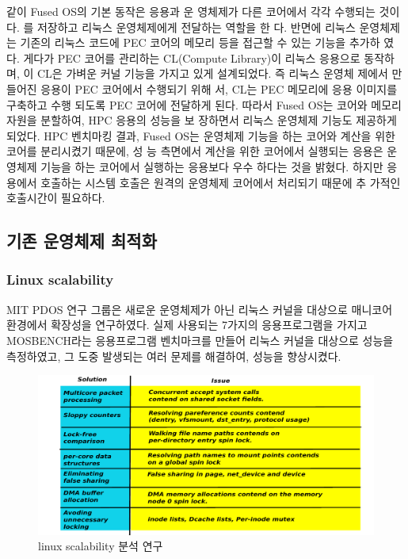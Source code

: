 같이 Fused OS의 기본 동작은 응용과 운
영체제가 다른 코어에서 각각 수행되는 것이다.
를 저장하고 리눅스 운영체제에게 전달하는 역할을 한
다. 반면에 리눅스 운영체제는 기존의 리눅스 코드에
PEC 코어의 메모리 등을 접근할 수 있는 기능을 추가하
였다. 게다가 PEC 코어를 관리하는 CL(Compute
Library)이 리눅스 응용으로 동작하며, 이 CL은 가벼운
커널 기능을 가지고 있게 설계되었다. 즉 리눅스 운영체
제에서 만들어진 응용이 PEC 코어에서 수행되기 위해
서, CL는 PEC 메모리에 응용 이미지를 구축하고 수행
되도록 PEC 코어에 전달하게 된다. 따라서 Fused OS는
코어와 메모리 자원을 분할하여, HPC 응용의 성능을 보
장하면서 리눅스 운영체제 기능도 제공하게 되었다.
HPC 벤치마킹 결과, Fused OS는 운영체제 기능을
하는 코어와 계산을 위한 코어를 분리시켰기 때문에, 성
능 측면에서 계산을 위한 코어에서 실행되는 응용은 운
영체제 기능을 하는 코어에서 실행하는 응용보다 우수
하다는 것을 밝혔다. 하지만 응용에서 호출하는 시스템
호출은 원격의 운영체제 코어에서 처리되기 때문에 추
가적인 호출시간이 필요하다.


\subsection{기존 운영체제 최적화}

\subsubsection{Linux scalability}

MIT PDOS 연구 그룹은 새로운 운영체제가 아닌 리눅스 커널을 대상으로 매니코어 환경에서 확장성을 연구하였다.
실제 사용되는 7가지의 응용프로그램을 가지고 MOSBENCH라는 응용프로그램 벤치마크를 만들어 리눅스 커널을 대상으로 
성능을 측정하였고, 그 도중 발생되는 여러 문제를 해결하여, 성능을 향상시켰다.

\begin{figure}[h!]
    \centering
    \includegraphics[width=1\textwidth]{fig/linux/linux}
    \caption{linux scalability 분석 연구}
  \label{fig:linux}
\end{figure}


